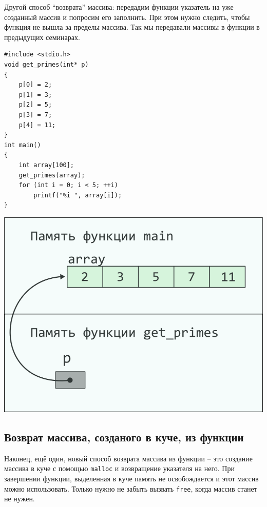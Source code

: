 \documentclass[10pt]{article}
\begin{document}
Другой способ ``возврата'' массива: передадим функции указатель на
уже созданный массив и попросим его заполнить.
При этом нужно следить, чтобы функция не вышла за пределы массива.
Так мы передавали массивы в функции в предыдущих семинарах.


\noindent\begin{minipage}{.45\textwidth}
\begin{lstlisting}
#include <stdio.h>
void get_primes(int* p) 
{
    p[0] = 2;
    p[1] = 3;
    p[2] = 5;
    p[3] = 7;
    p[4] = 11;	
}
int main() 
{
    int array[100];
    get_primes(array);
    for (int i = 0; i < 5; ++i)
        printf("%i ", array[i]);
}
\end{lstlisting}
\end{minipage}
\begin{minipage}{.45\textwidth}
\includegraphics[scale=0.9]{../images/pointer_schemes/function_return_arg_array.png}
\end{minipage}
\newpage
\subsection*{Возврат массива, созданого в куче, из функции}

Наконец, ещё один, новый способ возврата массива из функции -- это создание
массива в куче с помощью \texttt{malloc} и возвращение указателя на него.
При завершении функции, выделенная в куче память не освобождается и этот массив
можно использовать. Только нужно не забыть вызвать \texttt{free}, когда 
массив станет не нужен.
\end{document}
